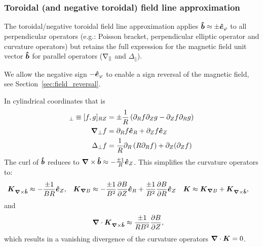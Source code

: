 \subsubsection{Toroidal (and negative toroidal) field line approximation}\label{sec:torfieldlineapprox}
The toroidal/negative toroidal field line approximation applies \(\bm{\hat{b}}\approx \pm \bm{\hat{e}}_\varphi\) to all perpendicular operators
(e.g.: Poisson bracket, perpendicular elliptic operator and curvature operators)
but retains the full expression for the magnetic field unit vector \(\bm{\hat{b}}\)
for parallel operators (\(\nabla_\parallel\) and \(\Delta_\parallel\)).
\begin{tcolorbox}[title=Note]
We allow the negative sign $-\bm{\hat{e}}_\varphi$ to enable a sign reversal of the magnetic field, see Section~\ref{sec:field_reversal}.
\end{tcolorbox}
In cylindrical coordinates that is
\begin{align}
[f,g]_\perp \equiv [f,g]_{RZ} &= \pm\frac{1}{R} \left(\partial_R f\partial_Z g - \partial_Z f\partial_R g\right) \\
\np f &= \partial_R f \ehat_R + \partial_Z f \ehat_Z \\
\Delta_\perp f &= \frac{1}{R}\partial_R \left( R \partial_R f\right) + \partial_Z(\partial_Z f)
\label{}
\end{align}
The curl of $\bm{\hat{b}}$ reduces to
 ${\boldsymbol{\nabla}}\times\bm{\hat{b}} \approx -  \frac{\pm 1}{R} \bm{\hat{e}}_Z$.
This simplifies the curvature operators to:
\begin{align}
{\boldsymbol{{K}}}_{{{\boldsymbol{\nabla}}\times\bm{\hat{b}}}}  &\approx  -  \frac{\pm 1}{B R} \bm{\hat{e}}_Z , &
{\boldsymbol{ {K} }}_{{\boldsymbol{\nabla}}  B}  &\approx  -\frac{\pm 1}{B^2}\frac{\partial B}{\partial Z}\bm{\hat{e}}_R +\frac{\pm 1}{B^2} \frac{\partial B}{\partial R}\bm{\hat{e}}_Z &
{\boldsymbol{ {K} }} &\approx {\boldsymbol{ {K} }}_{{\boldsymbol{\nabla}}  B}  +{\boldsymbol{ {K} }}_{{{\boldsymbol{\nabla}}\times\bm{\hat{b}}}} ,
\end{align}
and
\begin{align}
 {\boldsymbol{\nabla}}\cdot {\boldsymbol{{K}}}_{{{\boldsymbol{\nabla}}\times\bm{\hat{b}}}} &\approx \frac{\pm 1}{R B^2} \frac{\partial B}{\partial Z},
\end{align}
which results in a vanishing divergence of the curvature operators \( {\boldsymbol{\nabla}}\cdot {\boldsymbol{ {K} }} = 0\).

